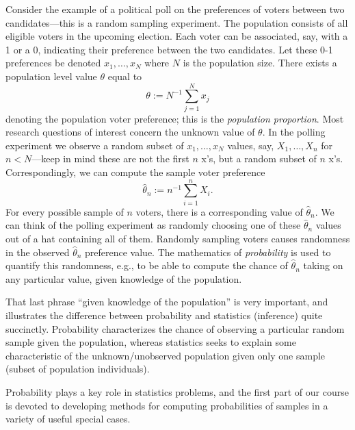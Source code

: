 \documentclass[]{book}
\begin{document}
Consider the example of a political poll on the preferences of voters
between two candidates---this is a random sampling experiment. The
population consists of all eligible voters in the upcoming election.
Each voter can be associated, say, with a 1 or a 0, indicating their
preference between the two candidates. Let these 0-1 preferences be
denoted \(x_1, \ldots, x_N\) where \(N\) is the population size. There
exists a population level value \(\theta\) equal to
\[\theta:=N^{-1}\sum_{j=1}^N x_j\] denoting the population voter
preference; this is the \emph{population proportion}. Most research
questions of interest concern the unknown value of \(\theta\). In the
polling experiment we observe a random subset of \(x_1, \ldots, x_N\)
values, say, \(X_1, \ldots, X_n\) for \(n<N\)---keep in mind these are
not the first \(n\) x's, but a random subset of \(n\) x's.
Correspondingly, we can compute the sample voter preference
\[\hat\theta_n := n^{-1}\sum_{i=1}^n X_i.\] For every possible sample of
\(n\) voters, there is a corresponding value of \(\hat\theta_n\). We can
think of the polling experiment as randomly choosing one of these
\(\hat\theta_n\) values out of a hat containing all of them. Randomly
sampling voters causes randomness in the observed \(\hat\theta_n\)
preference value. The mathematics of \emph{probability} is used to
quantify this randomness, e.g., to be able to compute the chance of
\(\hat\theta_n\) taking on any particular value, given knowledge of the
population.

That last phrase ``given knowledge of the population'' is very
important, and illustrates the difference between probability and
statistics (inference) quite succinctly. Probability characterizes the
chance of observing a particular random sample given the population,
whereas statistics seeks to explain some characteristic of the
unknown/unobserved population given only one sample (subset of
population individuals).

Probability plays a key role in statistics problems, and the first part
of our course is devoted to developing methods for computing
probabilities of samples in a variety of useful special cases.
\end{document}

